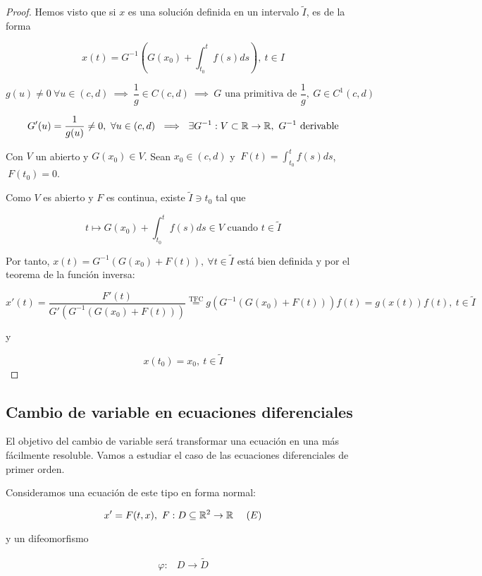 

\begin{proof}

Hemos visto que si $x$ es una solución definida en un intervalo $\tilde{I}$, es de la forma

\[
x(t) = G^{-1}\left(G(x_0) + \int_{t_0}^t f(s)ds\right),\ t\in I
\]  
  
\[g(u) \neq 0 \ \forall u \in (c,d) \ \implies \ \frac{1}{g} \in C(c,d) \ \implies \ G \text{ una primitiva de } \frac{1}{g}, \ G\in C^{1}(c,d)\]

\[G'(u) = \frac{1}{g(u)} \neq 0, \ \forall u \in (c,d) \ \implies \ \exists G^{-1}:V\subset \mathbb{R} \to \mathbb{R}, \ G^{-1} \text{ derivable}\]

Con $V$ un abierto y $G(x_0) \in V$.
Sean $x_0 \in (c,d)$ y $\ F(t) = \displaystyle\int_{t_0}^t f(s) ds$, $\ F(t_0) = 0$.

Como $V$ es abierto y $F$ es continua, existe $\tilde{I} \ni t_0$ tal que

\[t \mapsto G(x_0)+\int_{t_0}^t f(s) ds  \in V \text{ cuando } t\in \tilde{I}\]

Por tanto, $x(t) = G^{-1}\left(G(x_0) + F(t)\right), \ \forall t \in \tilde{I}$ está bien definida y por el teorema de la función inversa:

\[x'(t) = \frac{F'(t)}{G'(G^{-1}(G(x_0) + F(t)))} \stackrel{\text{TFC}}{=} g\left(G^{-1}\left(G(x_0) + F(t)\right)\right)f(t) = g(x(t))f(t),\ t\in \tilde{I}\]

y

\[x(t_0) = x_0,\ t\in \tilde{I}\]


\end{proof}

  
\subsection{Cambio de variable en ecuaciones diferenciales}
El objetivo del cambio de variable será transformar una ecuación en una más fácilmente resoluble.
Vamos a estudiar el caso de las ecuaciones diferenciales de primer orden.


Consideramos una ecuación de este tipo en forma normal:

\[
  x' = F(t, x),\ F : D \subseteq \mathbb{R}^2 \to \mathbb{R} \ \ \ \ (E)
  \]

  y un difeomorfismo

  \[
  \begin{array}{lll}
    \varphi : & D \to \tilde{D} \\ 
  \end{array}
  \]

